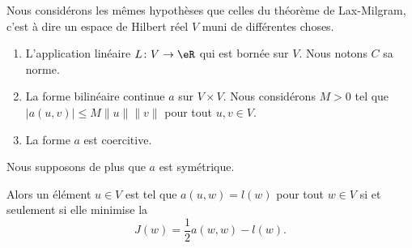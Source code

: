 \begin{theorem}
    Nous considérons les mêmes hypothèses que celles du théorème de Lax-Milgram, c'est à dire un espace de Hilbert réel \( V\) muni de différentes choses.
    \begin{enumerate}
        \item
            L'application linéaire \( L\colon V\to \eR\) qui est bornée sur \( V\). Nous notons \( C\) sa norme.
        \item
            La forme bilinéaire continue \( a\) sur \( V\times V\). Nous considérons \( M>0\) tel que \( | a(u,v) |\leq M\| u \|\| v \|\) pour tout \( u,v\in V\).
        \item
            La forme \( a\) est coercitive.
    \end{enumerate}
    Nous supposons de plus que \( a\) est symétrique.

    Alors un élément \( u\in V\) est tel que \( a(u,w)=l(w)\) pour tout \( w\in V\) si et seulement si elle minimise la 
    \begin{equation}
        J(w)=\frac{ 1 }{2}a(w,w)-l(w).
    \end{equation}
\end{theorem}

